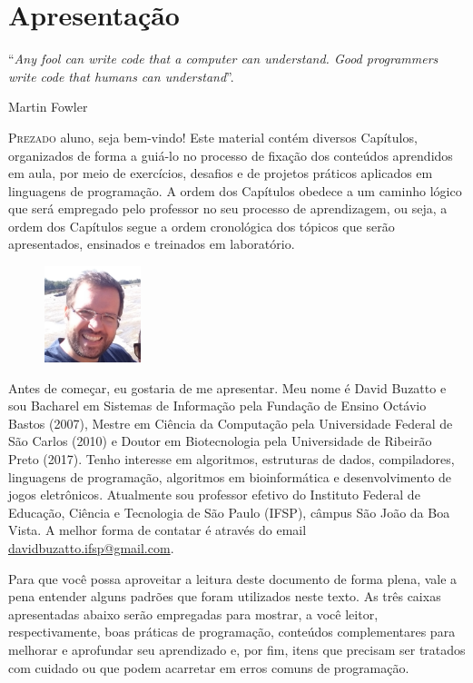 \chapter*{Apresentação}
\epigraph{``\textit{Any fool can write code that a computer can understand. Good programmers write code that humans can understand}''.}{Martin Fowler}

\lettrine[lines=4, lhang=0.1, lraise=0, loversize=0.2, findent=0.1em]{\textcolor{corAzulTema}{P}}{rezado} aluno, seja bem-vindo! Este material contém diversos Capítulos, organizados de forma a guiá-lo no processo de fixação dos conteúdos aprendidos em aula, por meio de exercícios, desafios e de projetos práticos aplicados em linguagens de programação. A ordem dos Capítulos obedece a um caminho lógico que será empregado pelo professor no seu processo de aprendizagem, ou seja, a ordem dos Capítulos segue a ordem cronológica dos tópicos que serão apresentados, ensinados e treinados em laboratório.

\begin{figure}
    \centering
    \includegraphics[width=0.25\textwidth]{imagens/david}
\end{figure}

Antes de começar, eu gostaria de me apresentar. Meu nome é David Buzatto e sou Bacharel em Sistemas de Informação pela Fundação de Ensino Octávio Bastos (2007), Mestre em Ciência da Computação pela Universidade Federal de São Carlos (2010) e Doutor em Biotecnologia pela Universidade de Ribeirão Preto (2017). Tenho interesse em algoritmos, estruturas de dados, compiladores, linguagens de programação, algoritmos em bioinformática e desenvolvimento de jogos eletrônicos. Atualmente sou professor efetivo do Instituto Federal de Educação, Ciência e Tecnologia de São Paulo (IFSP), câmpus São João da Boa Vista. A melhor forma de contatar é através do email \textcolor{blue}{\href{mailto:davidbuzatto.ifsp@gmail.com}{davidbuzatto.ifsp@gmail.com}}.

Para que você possa aproveitar a leitura deste documento de forma plena, vale a pena entender alguns padrões que foram utilizados neste texto. As três caixas apresentadas abaixo serão empregadas para mostrar, a você leitor, respectivamente, boas práticas de programação, conteúdos complementares para melhorar e aprofundar seu aprendizado e, por fim, itens que precisam ser tratados com cuidado ou que podem acarretar em erros comuns de programação.

